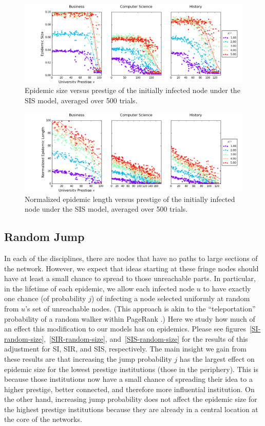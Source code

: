 \documentclass[%
 reprint,
 amsmath,amssymb,
 aps,
]{revtex4-1}
\begin{document}
\begin{figure}
	\centering
  \includegraphics[width=\textwidth]{figures/size-results-of-ALL-SIS.png}
  \caption{Epidemic size versus prestige of the initially infected node under the SIS model, averaged over 500 trials.}
  \label{SIS-size}
\end{figure}

\begin{figure}
	\centering
  \includegraphics[width=\textwidth]{figures/length-results-of-ALL-SIS.png}
  \caption{Normalized epidemic length versus prestige of the initially infected node under the SIS model, averaged over 500 trials.}
   \label{SIS-length}
\end{figure}

\subsection{\label{sec:level2}Random Jump}
In each of the disciplines, there are nodes that have no paths to large sections of the network. However, we expect that ideas starting at these fringe nodes should have at least a small chance to spread to those unreachable parts. In particular, in the lifetime of each epidemic, we allow each infected node $u$ to have exactly one chance (of probability $j$) of infecting a node selected uniformly at random from $u$'s set of unreachable nodes. (This approach is akin to the ``teleportation'' probability of a random walker within PageRank \cite{page:rank}.) Here we study how much of an effect this modification to our models has on epidemics. Please see figures~\ref{SI-random-size},~\ref{SIR-random-size}, and~\ref{SIS-random-size} for the results of this adjustment for SI, SIR, and SIS, respectively. The main insight we gain from these results are that increasing the jump probability $j$ has the largest effect on epidemic size for the lowest prestige institutions (those in the periphery). This is because those institutions now have a small chance of spreading their idea to a higher prestige, better connected, and therefore more influential institution. On the other hand, increasing jump probability does not affect the epidemic size for the highest prestige institutions because they are already in a central location at the core of the networks.
\end{document}
